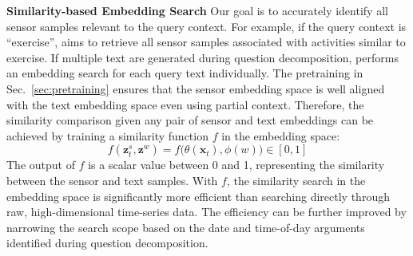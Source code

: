 



\textbf{Similarity-based Embedding Search} 
Our goal is to accurately identify all sensor samples relevant to the query context.
For example, if the query context is ``exercise'', \Method aims to retrieve all sensor samples associated with activities similar to exercise.
If multiple text are generated during question decomposition, \Method performs an embedding search for each query text individually.
The pretraining in Sec.~\ref{sec:pretraining} ensures that the sensor embedding space is well aligned with the text embedding space even using partial context. 
Therefore, the similarity comparison given any pair of sensor and text embeddings can be achieved by training a similarity function $f$ in the embedding space: 
\begin{equation}
f(\mathbf{z}^s_t, \mathbf{z}^w) = f \big(\theta(\mathbf{x}_t), \phi(w) \big) \in [0, 1]
\end{equation}
The output of $f$ is a scalar value between 0 and 1, representing the similarity between the sensor and text samples.
With $f$, the similarity search in the embedding space is significantly more efficient than searching directly through raw, high-dimensional time-series data. The efficiency can be further improved by narrowing the search scope based on the date and time-of-day arguments identified during question decomposition.

